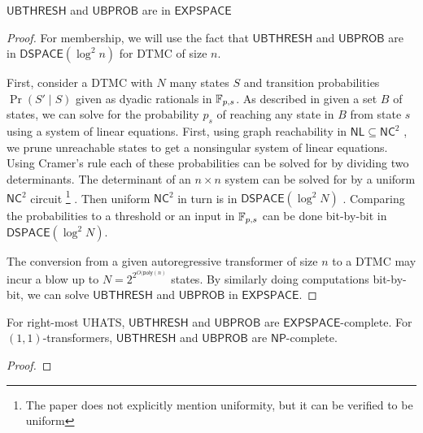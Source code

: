 \documentclass[acmsmall,screen,review,anonymous,nonacm]{PLDI/acmart}
\begin{document}
\begin{theorem}
    $\mathsf{UBTHRESH}$ and $\mathsf{UBPROB}$ are in $\mathsf{EXPSPACE}$
\end{theorem}
\begin{proof}
    For membership, we will use the fact that $\mathsf{UBTHRESH}$ and $\mathsf{UBPROB}$ are in $\mathsf{DSPACE}(\log^2 n)$ for DTMC of size $n$.

    First, consider a DTMC with $N$ many states $S$ and transition probabilities $\Pr(S'\mid S)$ given as dyadic rationals in $\mathbb{F}_{p,s}$.
    As described in \citet{baier2008principles} given a set $B$ of states, we can solve for the probability $p_s$ of reaching any state in $B$ from state $s$ using a system of linear equations. 
    First, using graph reachability in $\mathsf{NL}\subseteq \mathsf{NC}^2$ \citep{SAVITCH1970177}, we prune unreachable states to get a nonsingular system of linear equations.
    Using Cramer's rule each of these probabilities can be solved for by dividing two determinants. 
    The determinant of an $n\times n$ system can be solved for by a uniform $\mathsf{NC}^2$ circuit \citep{Mahajan1997DeterminantCA}\footnote{The paper does not explicitly mention uniformity, but it can be verified to be uniform} .
    Then uniform $\mathsf{NC}^2$ in turn is in $\mathsf{DSPACE}(\log^2N)$ \citep{borodin1977relating}.
    Comparing the probabilities to a threshold or an input in $\mathbb{F}_{p,s}$ can be done bit-by-bit in $\mathsf{DSPACE}(\log^2N)$.

    
    The conversion from a given autoregressive transformer of size $n$ to a DTMC may incur a blow up to $N=2^{2^{O(\mathsf{poly}(n)}}$ states. 
    By similarly doing computations bit-by-bit, we can solve $\mathsf{UBTHRESH}$ and $\mathsf{UBPROB}$ in $\mathsf{EXPSPACE}$.
\end{proof}

\begin{theorem}
    For right-most UHATS, $\mathsf{UBTHRESH}$ and $\mathsf{UBPROB}$ are $\mathsf{EXPSPACE}$-complete.
    For $(1,1)$-transformers, $\mathsf{UBTHRESH}$ and $\mathsf{UBPROB}$ are $\mathsf{NP}$-complete.
\end{theorem}
\begin{proof}
    
\end{proof}



% 


\end{document}
